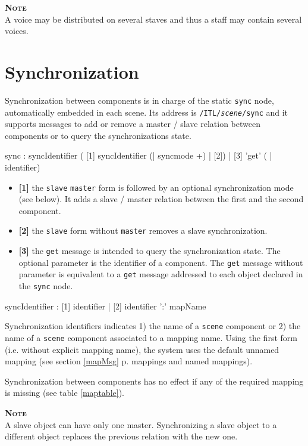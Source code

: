 \documentclass[a4paper,twoside]{report}
\newcommand{\toplevel}[1]	{\chapter{#1}}
\newcommand{\fullref}[1]	{\ref{#1} p.\pageref{#1}}
\newcommand{\OSC}[1]		{\texttt{#1}}
\newcommand{\note}	[1]		{\vspace{2mm}\textbf{\hspace{-1.03cm}\textbf{\textsc{Note #1}}}}
\begin{document}
\note{} \\
A voice may be distributed on several staves and thus a staff may contain several voices.


\toplevel{Synchronization}
\label{syncmsg}

Synchronization between components is in charge of the static \OSC{sync} node, automatically embedded in each scene. Its address is \OSC{/ITL/\textit{scene}/sync} and it supports messages to add or remove a master / slave relation between components or to query the synchronizations state.
\begin{rail}
sync : syncIdentifier 
	 ( [1] syncIdentifier (| syncmode +) 
	   | [2])
	   | [3] 'get' ( | identifier)
\end{rail}


\begin{itemize}
\item \textbf{[1]} the \OSC{slave} \OSC{master} form is followed by an optional synchronization mode (see below). It adds a slave / master relation between the first and the second component.
\item \textbf{[2]} the \OSC{slave} form without \OSC{master} removes a slave synchronization.
\item \textbf{[3]} the \OSC{get} message is intended to query the synchronization state. The optional parameter is the identifier of a component. The \OSC{get} message without parameter is equivalent to a \OSC{get} message addressed to each object declared in the \OSC{sync} node.
\end{itemize}

\begin{rail}
syncIdentifier : [1] identifier 
		| [2] identifier ':' mapName
\end{rail}

Synchronization identifiers indicates 1) the name of a \OSC{scene} component or 2) the name of a \OSC{scene} component associated to a mapping name. Using the first form (i.e. without explicit mapping name), the system uses the default unnamed mapping (see section \fullref{mapMsg} mappings and named mappings).

Synchronization between components has no effect if any of the required mapping is missing (see table \ref{maptable}).

\note{} \\
A slave object can have only one master. Synchronizing a slave object to a different object replaces the previous relation with the new one.
\end{document}
